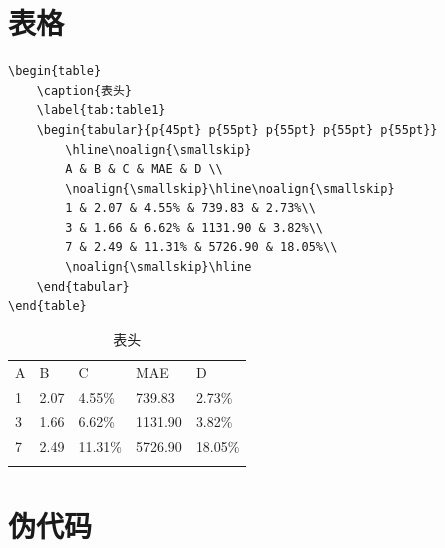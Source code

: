 \documentclass{article}
\begin{document}
	\section{表格}
	\begin{lstlisting}
\begin{table}
	\caption{表头}
	\label{tab:table1}
	\begin{tabular}{p{45pt} p{55pt} p{55pt} p{55pt} p{55pt}}
		\hline\noalign{\smallskip}
		A & B & C & MAE & D \\
		\noalign{\smallskip}\hline\noalign{\smallskip}
		1 & 2.07 & 4.55% & 739.83 & 2.73%\\
		3 & 1.66 & 6.62% & 1131.90 & 3.82%\\
		7 & 2.49 & 11.31% & 5726.90 & 18.05%\\
		\noalign{\smallskip}\hline
	\end{tabular}
\end{table}
	\end{lstlisting}
	\begin{table}
		\caption{表头}
		\label{tab:table1}
		\begin{tabular}{p{45pt} p{55pt} p{55pt} p{55pt} p{55pt}}
			\hline\noalign{\smallskip}
			A & B & C & MAE & D \\
			\noalign{\smallskip}\hline\noalign{\smallskip}
			1 & 2.07 & 4.55\% & 739.83 & 2.73\%\\
			3 & 1.66 & 6.62\% & 1131.90 & 3.82\%\\
			7 & 2.49 & 11.31\% & 5726.90 & 18.05\%\\
			\noalign{\smallskip}\hline
		\end{tabular}
	\end{table}
	
	\section{伪代码}
	
\end{document}
